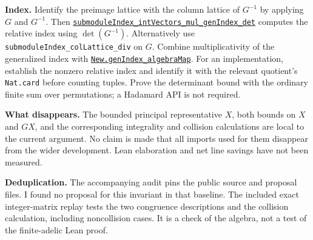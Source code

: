 \documentclass[11pt]{article}
\begin{document}
\smallskip\noindent\textbf{Index.}
Identify the preimage lattice with the column lattice of $G^{-1}$
by applying $G$ and $G^{-1}$. Then
\href{https://github.com/VladimirReshetnikov/ProveIt/blob/2c38f343aa14c8ce85ab1c7a203774c7d05a9780/Analysis/GeneralizedRiemannHypothesis/Lean/grh/src/Lib/General/NumberTheory/LatticeCovolumes.lean#L197}{\texttt{submoduleIndex\_intVectors\_mul\_genIndex\_det}}
computes the relative index using $\det(G^{-1})$.
Alternatively use \texttt{submoduleIndex\_colLattice\_div} on $G$.
Combine multiplicativity of the generalized index with
\href{https://github.com/VladimirReshetnikov/ProveIt/blob/2c38f343aa14c8ce85ab1c7a203774c7d05a9780/Analysis/GeneralizedRiemannHypothesis/Lean/grh/src/Lib/Adelic/Adeles/IdeleModulus.lean#L399}{\texttt{New.genIndex\_algebraMap}}.
For an implementation, establish the nonzero relative index and identify
it with the relevant quotient's \texttt{Nat.card} before counting tuples.
Prove the determinant bound with the ordinary finite sum over permutations;
a Hadamard API is not required.

\smallskip\noindent\textbf{What disappears.}
The bounded principal representative $X$, both bounds on $X$ and $GX$,
and the corresponding integrality and collision calculations are
local to the current argument. No claim is made that all imports used
for them disappear from the wider development. Lean elaboration and net
line savings have not been measured.

\smallskip\noindent\textbf{Deduplication.}
The accompanying audit pins the public source and proposal files.
I found no proposal for this invariant in that baseline. The included
exact integer-matrix replay tests the two congruence descriptions and the
collision calculation, including noncollision cases. It is a check of the
algebra, not a test of the finite-adelic Lean proof.
\end{document}
